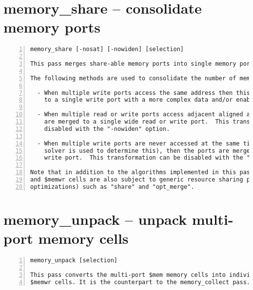 \section{memory\_share -- consolidate memory ports}
\label{cmd:memory_share}
\begin{lstlisting}[numbers=left,frame=single]
    memory_share [-nosat] [-nowiden] [selection]

This pass merges share-able memory ports into single memory ports.

The following methods are used to consolidate the number of memory ports:

  - When multiple write ports access the same address then this is converted
    to a single write port with a more complex data and/or enable logic path.

  - When multiple read or write ports access adjacent aligned addresses, they
    are merged to a single wide read or write port.  This transformation can be
    disabled with the "-nowiden" option.

  - When multiple write ports are never accessed at the same time (a SAT
    solver is used to determine this), then the ports are merged into a single
    write port.  This transformation can be disabled with the "-nosat" option.

Note that in addition to the algorithms implemented in this pass, the $memrd
and $memwr cells are also subject to generic resource sharing passes (and other
optimizations) such as "share" and "opt_merge".
\end{lstlisting}

\section{memory\_unpack -- unpack multi-port memory cells}
\label{cmd:memory_unpack}
\begin{lstlisting}[numbers=left,frame=single]
    memory_unpack [selection]

This pass converts the multi-port $mem memory cells into individual $memrd and
$memwr cells. It is the counterpart to the memory_collect pass.
\end{lstlisting}

